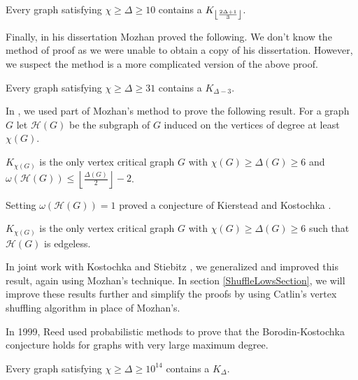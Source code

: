 \begin{thm}\label{MozhanTwoThirdsBK}
Every graph satisfying $\chi \geq \Delta \geq 10$ contains a $K_{\left\lfloor\frac{2\Delta + 1}{3}\right\rfloor}$.
\end{thm}

Finally, in his dissertation Mozhan proved the following.  We don't know the
method of proof as we were unable to obtain a copy of his dissertation. 
However, we suspect the method is a more complicated version of the above proof.

\begin{thm}[Mozhan]\label{MozhanBK}
Every graph satisfying $\chi \geq \Delta \geq 31$ contains a $K_{\Delta - 3}$.
\end{thm}

In \cite{rabern2010a}, we used part of Mozhan's method to prove the following result.  For a graph $G$ let $\mathcal{H}(G)$ be the subgraph of $G$ induced on the vertices of degree at least $\chi(G)$.

\begin{thm}\label{TheoremM}
$K_{\chi(G)}$ is the only vertex critical graph $G$ with $\chi(G) \geq \Delta(G) \geq 6$ and $\omega(\mathcal{H}(G)) \leq \left \lfloor \frac{\Delta(G)}{2} \right \rfloor - 2$.
\end{thm}

Setting $\omega(\mathcal{H}(G)) = 1$ proved a conjecture of Kierstead and Kostochka \cite{kierstead2009ore}.

\begin{cor}\label{CorollaryN}
$K_{\chi(G)}$ is the only vertex critical graph $G$ with $\chi(G) \geq \Delta(G) \geq 6$ such that $\mathcal{H}(G)$ is edgeless.
\end{cor}

In joint work with Kostochka and Stiebitz \cite{krs_one}, we generalized and improved this result, again using Mozhan's technique.  
In section \ref{ShuffleLowsSection}, we will improve these results further and simplify the proofs by using Catlin's vertex shuffling algorithm in place of Mozhan's.

In 1999, Reed used probabilistic methods to prove that the Borodin-Kostochka conjecture holds for graphs with very large maximum degree.

\begin{thm}\label{ReedBK}
Every graph satisfying $\chi \geq \Delta \geq 10^{14}$ contains a $K_\Delta$.
\end{thm}

